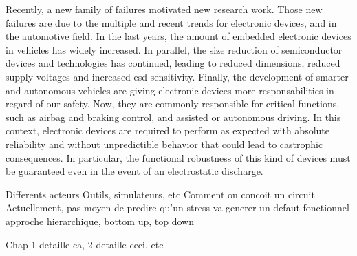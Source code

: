 Recently, a new family of failures motivated new research work.
Those new failures are due to the multiple and recent trends for electronic devices, and in the automotive field.
In the last years, the amount of embedded electronic devices in vehicles has widely increased.
In parallel, the size reduction of semiconductor devices and technologies has continued, leading to reduced dimensions, reduced supply voltages and increased \gls{esd} sensitivity.
Finally, the development of smarter and autonomous vehicles are giving electronic devices more responsabilities in regard of our safety.
Now, they are commonly responsible for critical functions, such as airbag and braking control, and assisted or autonomous driving.
In this context, electronic devices are required to perform as expected with absolute reliability and without unpredictible behavior that could lead to castrophic consequences.
In particular, the functional robustness of this kind of devices must be guaranteed even in the event of an electrostatic discharge.

Differents acteurs
Outils, simulateurs, etc
Comment on concoit un circuit
Actuellement, pas moyen de predire qu'un stress va generer un defaut fonctionnel
approche hierarchique, bottom up, top down

Chap 1 detaille ca, 2 detaille ceci, etc
